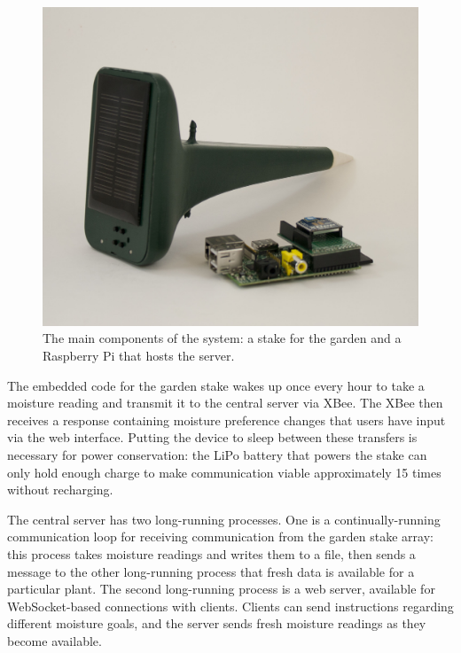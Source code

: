 \documentclass[11pt]{article}
\begin{document}
\begin{figure}[h!]
\begin{center}
\includegraphics[scale=0.15]{./pngs/device.jpg}
\end{center}
\caption{The main components of the system: a stake for the garden and a Raspberry Pi that hosts the server.}
\label{fig:device}
\end{figure}

The embedded code for the garden stake wakes up once every hour to take a moisture reading and transmit it to the central server via XBee.  The XBee then receives a response containing moisture preference changes that users have input via the web interface.  Putting the device to sleep between these transfers is necessary for power conservation: the LiPo battery that powers the stake can only hold enough charge to make communication viable approximately 15 times without recharging.

The central server has two long-running processes.  One is a continually-running communication loop for receiving communication from the garden stake array: this process takes moisture readings and writes them to a file, then sends a message to the other long-running process that fresh data is available for a particular plant.  The second long-running process is a web server, available for WebSocket-based connections with clients.  Clients can send instructions regarding different moisture goals, and the server sends fresh moisture readings as they become available.
\end{document}

